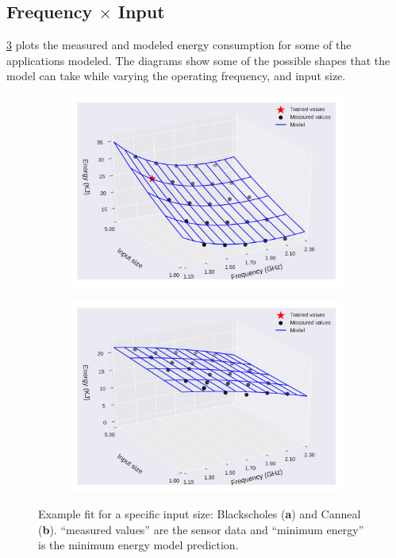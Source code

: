 \subsection{Frequency $\times$ Input}
\cref{fig:en_eq_freq_inp_fi} plots the measured and modeled energy consumption for some of the applications modeled. The diagrams show some of the possible shapes that the model can take while varying the operating frequency, and input size.
\begin{figure}[H]
	\centering
	\captionsetup[subfigure]{justification=centering}
	\begin{subfigure}[b]{0.45\textwidth}
		\centerline{\includegraphics[width=\columnwidth]{models/figures/energy/freq_inps/completo_black_5.pdf}}
		\caption{}
		\label{fig:en_eq_black_fi}
	\end{subfigure}
	\begin{subfigure}[b]{0.45\textwidth}
		\centerline{\includegraphics[width=\columnwidth]{models/figures/energy/freq_inps/completo_canneal_1.pdf}}
		\caption{}
		\label{fig:en_eq_canneal_fi}
	\end{subfigure}
	
	\caption{Example fit for a specific input size: Blackscholes (\textbf{a}) and Canneal (\textbf{b}).  “measured values” are the sensor data and “minimum energy” is the minimum energy model prediction.
	}
	\label{fig:en_eq_freq_inp_fi}
\end{figure}
